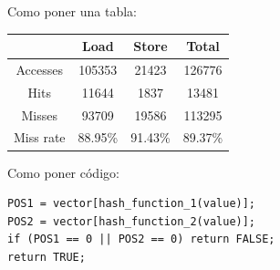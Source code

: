 Como poner una tabla:
\begin{center}
   \begin{tabular}{| c || c | c | c |}
      \hline
      	           & Load	& Store		& Total		\\ \hline \hline
	Accesses   & 105353	& 21423		& 126776	\\ \hline
	Hits       &  11644	&  1837		&  13481	\\ \hline
	Misses     &  93709 	& 19586		& 113295	\\ \hline
	Miss rate  & 88.95\%	& 91.43\%	& 89.37\%	\\ \hline
   \end{tabular}
\end{center}

Como poner c\'{o}digo:
\begin{verbatim}
POS1 = vector[hash_function_1(value)];
POS2 = vector[hash_function_2(value)];
if (POS1 == 0 || POS2 == 0) return FALSE;
return TRUE;
\end{verbatim}

